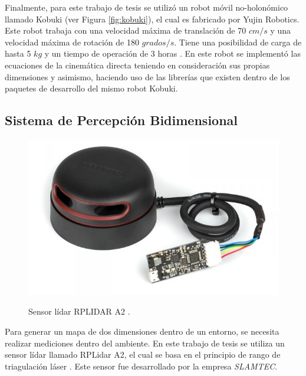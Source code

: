 Finalmente, para este trabajo de tesis se utilizó un robot móvil no-holonómico llamado 
Kobuki (ver Figura \ref{fig:kobuki}), el cual es fabricado por Yujin Robotics. Este robot 
trabaja con una velocidad máxima de translación de 70 $cm/s$ y una velocidad máxima de 
rotación de 180 $grados/s$. Tiene una posibilidad de carga de hasta 5 $kg$ y un tiempo 
de operación de 3 horas \cite{aboutKobuki}. En este robot se implementó las ecuaciones 
de la cinemática directa teniendo en consideración sus propias dimensiones y 
asimismo, haciendo uso de las librerías que existen dentro de los paquetes de desarrollo 
del mismo robot Kobuki.


\subsection{Sistema de Percepción Bidimensional}
\begin{figure}%
	\centering \footnotesize
 	{\includegraphics[width=0.60\linewidth]{images/rplidar.JPG}}
 	\captionsetup{font=footnotesize}
 	\caption[Sensor lídar RPLidar A2.]{Sensor lídar RPLIDAR A2 \cite{sensorLidar}.}
 	\label{f:lidar}
\end{figure}

Para generar un mapa de dos dimensiones dentro de un entorno, se necesita realizar 
mediciones dentro del ambiente. En este trabajo de tesis se utiliza un sensor lídar
llamado RPLidar A2, el cual se basa en el principio de rango de triagulación láser
\cite{amann2001laser}. Este sensor fue desarrollado por la empresa \textit{SLAMTEC}.

